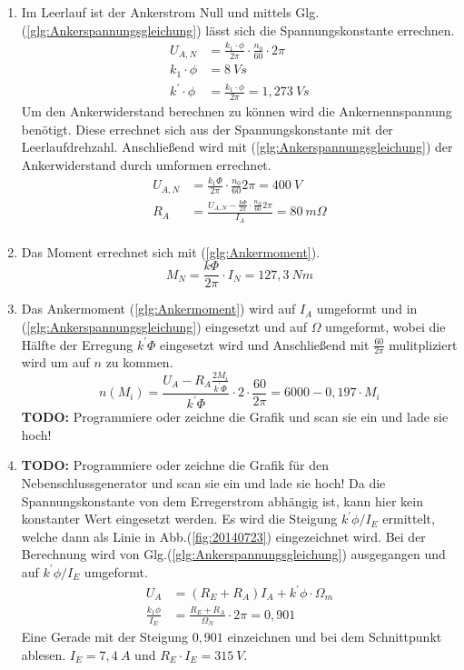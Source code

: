\begin{solution}
\begin{enumerate}
\item Im Leerlauf ist der Ankerstrom Null und mittels Glg.(\ref{glg:Ankerspannungsgleichung}) lässt sich die Spannungskonstante errechnen.
\begin{align}
U_{A,N} &= \frac{k_1 \cdot \phi}{2 \pi} \cdot \frac{n_0}{60} \cdot 2 \pi\\
k_1 \cdot \phi &= 8~Vs\\
k^{'} \cdot \phi &= \frac{k_1 \cdot \phi}{2 \pi} = 1,273~Vs
\end{align}
Um den Ankerwiderstand berechnen zu können wird die Ankernennspannung benötigt. Diese errechnet sich aus der Spannungskonstante mit der Leerlaufdrehzahl. Anschließend wird mit (\ref{glg:Ankerspannungsgleichung}) der Ankerwiderstand durch umformen errechnet.\\
\begin{align}
U_{A,N} &= \frac{k_1 \Phi}{2 \pi} \cdot \frac{n_0}{60} 2 \pi = 400~V\\
R_A &= \frac{U_{A,N} - \frac{k \Phi}{2 \pi} \cdot \frac{n_N}{60} 2 \pi}{I_A}=80~m \Omega\\
\end{align}
\item Das Moment errechnet sich mit (\ref{glg:Ankermoment}).\\
\begin{equation}
M_N=\frac{k \Phi}{2 \pi} \cdot I_N =127,3~Nm
\end{equation}
\item Das Ankermoment (\ref{glg:Ankermoment}) wird auf $I_A$ umgeformt und in (\ref{glg:Ankerspannungsgleichung}) eingesetzt und auf $\Omega$ umgeformt, wobei die Hälfte der Erregung $k^{'} \Phi$ eingesetzt wird und Anschließend mit $\frac{60}{2 \pi}$ mulitpliziert wird um auf $n$ zu kommen.
\begin{equation}
n(M_i) = \frac{U_A - R_A \frac{2 M_i}{k^{'} \Phi}}{k^{'}\Phi} \cdot 2 \cdot \frac{60}{2 \pi} =6000-0,197 \cdot M_i
\end{equation}
\textbf{TODO:} Programmiere oder zeichne die Grafik und scan sie ein und lade sie hoch!
\item \textbf{TODO:} Programmiere oder zeichne die Grafik für den Nebenschlussgenerator und scan sie ein und lade sie hoch! Da die Spannungskonstante von dem Erregerstrom abhängig ist, kann hier kein konstanter Wert eingesetzt werden. Es wird die Steigung $k^{'} \phi/I_E$ ermittelt, welche dann als Linie in Abb.(\ref{fig:20140723}) eingezeichnet wird. Bei der Berechnung wird von Glg.(\ref{glg:Ankerspannungsgleichung}) ausgegangen und auf $k^{'} \phi/I_E$ umgeformt.
\begin{align}
U_A &= (R_E +R_A)  I_A  + k^{'} \phi \cdot \Omega_m\\
\frac{k_1 \phi}{I_E} &= \frac{R_E +R_A}{\Omega_N}\cdot 2 \pi = 0,901
\end{align}
Eine Gerade mit der Steigung $0,901$ einzeichnen und bei dem Schnittpunkt ablesen. $I_E= 7,4~A$ und $R_E \cdot I_E = 315~V$.
\end{enumerate}
\end{solution}
